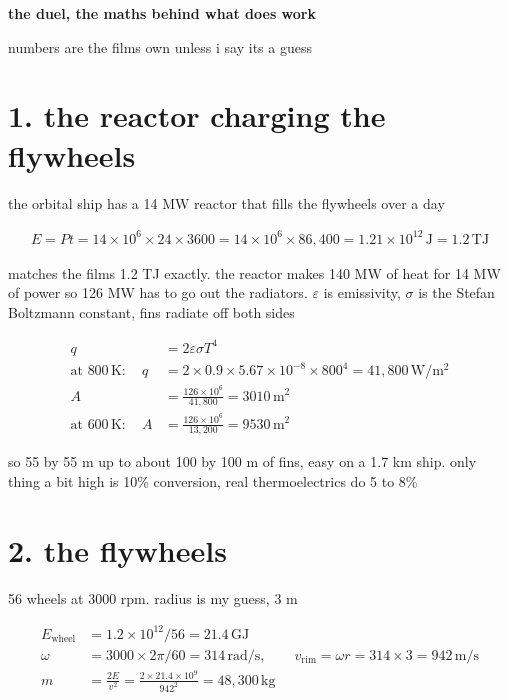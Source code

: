 \documentclass[11pt]{article}
\newcommand{\un}[1]{\,\mathrm{#1}}
\begin{document}
{\Large\bfseries the duel, the maths behind what does work}

\vspace{4pt}
numbers are the films own unless i say its a guess

\section*{1. the reactor charging the flywheels}

the orbital ship has a 14 MW reactor that fills the flywheels over a day

\begin{align*}
E = P t = 14\times10^6 \times 24 \times 3600 = 14\times10^6 \times 86{,}400 = 1.21\times10^{12}\un{J} = 1.2\un{TJ}
\end{align*}

matches the films 1.2 TJ exactly. the reactor makes 140 MW of heat for 14 MW of power so 126 MW has to go out the radiators. $\varepsilon$ is emissivity, $\sigma$ is the Stefan Boltzmann constant, fins radiate off both sides

\begin{align*}
q &= 2\varepsilon\sigma T^4\\
\text{at } 800\un{K}: \quad q &= 2 \times 0.9 \times 5.67\times10^{-8} \times 800^4 = 41{,}800\un{W/m^2}\\
A &= \frac{126\times10^6}{41{,}800} = 3010\un{m^2}\\
\text{at } 600\un{K}: \quad A &= \frac{126\times10^6}{13{,}200} = 9530\un{m^2}
\end{align*}

so 55 by 55 m up to about 100 by 100 m of fins, easy on a 1.7 km ship. only thing a bit high is 10\% conversion, real thermoelectrics do 5 to 8\%

\section*{2. the flywheels}

56 wheels at 3000 rpm. radius is my guess, 3 m

\begin{align*}
E_{\text{wheel}} &= 1.2\times10^{12}/56 = 21.4\un{GJ}\\
\omega &= 3000 \times 2\pi/60 = 314\un{rad/s}, \qquad v_{\text{rim}} = \omega r = 314 \times 3 = 942\un{m/s}\\
m &= \frac{2E}{v^2} = \frac{2 \times 21.4\times10^9}{942^2} = 48{,}300\un{kg}
\end{align*}
\end{document}
